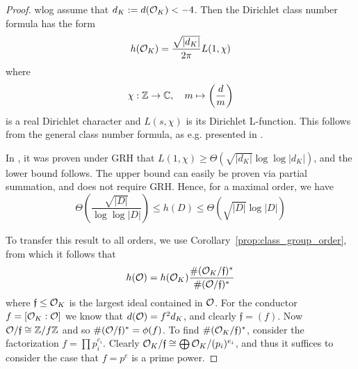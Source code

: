 \begin{proof}
    wlog assume that $d_K := d(\mathcal{O}_K) < -4$.
    Then the Dirichlet class number formula has the form
    \begin{equation*}
        h(\mathcal{O}_K) = \frac {\sqrt{|d_K|}} {2\pi} L(1, \chi)
    \end{equation*}
    where
    \begin{equation*}
        \chi: \mathbb{Z} \to \mathbb{C}, \quad m \mapsto \left(\frac d m\right)
    \end{equation*}
    is a real Dirichlet character and $L(s, \chi)$ is its Dirichlet L-function.
    This follows from the general class number formula, as e.g. presented in \cite[Korollar~VII.5.11]{neukirch}.

    In \cite[Thm~1]{class_number_lower_bound}, it was proven under GRH that $L(1, \chi) \geq \Theta(\sqrt{|d_K|}\log\log|d_K|)$, and the lower bound follows.
    The upper bound can easily be proven via partial summation, and does not require GRH.
    Hence, for a maximal order, we have
    \begin{equation*}
        \Theta\left(\frac {\sqrt{|D|}} {\log\log|D|}\right) \leq h(D) \leq \Theta\left(\sqrt{|D|} \log|D|\right)
    \end{equation*}

    To transfer this result to all orders, we use Corollary~\ref{prop:class_group_order}, from which it follows that
    \begin{equation*}
        h(\mathcal{O}) = h(\mathcal{O}_K) \frac {\#(\mathcal{O}_K / \mathfrak{f})^*} {\#(\mathcal{O} / \mathfrak{f})^*}
    \end{equation*}
    where $\mathfrak{f} \leq \mathcal{O}_K$ is the largest ideal contained in $\mathcal{O}$.
    For the conductor $f = [\mathcal{O}_K : \mathcal{O}]$ we know that $d(\mathcal{O}) = f^2 d_K$, and clearly $\mathfrak{f} = (f)$.
    Now $\mathcal{O}/\mathfrak{f} \cong \mathbb{Z}/f\mathbb{Z}$ and so $\#(\mathcal{O}/\mathfrak{f})^* = \phi(f)$.
    To find $\#(\mathcal{O}_K/\mathfrak{f})^*$, consider the factorization $f = \prod p_i^{e_i}$.
    Clearly $\mathcal{O}_K/\mathfrak{f} \cong \bigoplus \mathcal{O}_K/(p_i)^{e_i}$, and thus it suffices to consider the case that $f = p^e$ is a prime power.


\end{proof}
